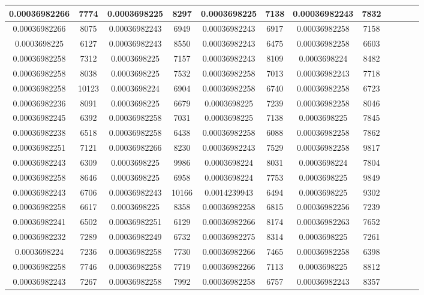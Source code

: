 \begin {table}[h]
\begin{tabular}{|c|c|c|c|c|c|c|c|c|c|c|c|}
\midrule
0.00036982266&7774&0.0003698225&8297&0.0003698225&7138&0.00036982243&7832\\
\midrule
0.00036982266&8075&0.00036982243&6949&0.00036982243&6917&0.00036982258&7158\\
\midrule
0.0003698225&6127&0.00036982243&8550&0.00036982243&6475&0.00036982258&6603\\
\midrule
0.00036982258&7312&0.0003698225&7157&0.00036982243&8109&0.0003698224&8482\\
\midrule
0.00036982258&8038&0.0003698225&7532&0.00036982258&7013&0.00036982243&7718\\
\midrule
0.00036982258&10123&0.0003698224&6904&0.00036982258&6740&0.00036982258&6723\\
\midrule
0.00036982236&8091&0.0003698225&6679&0.0003698225&7239&0.00036982258&8046\\
\midrule
0.00036982245&6392&0.00036982258&7031&0.0003698225&7138&0.0003698225&7845\\
\midrule
0.00036982238&6518&0.00036982258&6438&0.00036982258&6088&0.00036982258&7862\\
\midrule
0.00036982251&7121&0.00036982266&8230&0.00036982243&7529&0.00036982258&9817\\
\midrule
0.00036982243&6309&0.0003698225&9986&0.0003698224&8031&0.0003698224&7804\\
\midrule
0.00036982258&8646&0.0003698225&6958&0.0003698224&7753&0.0003698225&9849\\
\midrule
0.00036982243&6706&0.00036982243&10166&0.0014239943&6494&0.0003698225&9302\\
\midrule
0.00036982258&6617&0.0003698225&8358&0.00036982258&6815&0.00036982256&7239\\
\midrule
0.00036982241&6502&0.00036982251&6129&0.00036982266&8174&0.00036982263&7652\\
\midrule
0.00036982232&7289&0.00036982249&6732&0.00036982275&8314&0.0003698225&7261\\
\midrule
0.0003698224&7236&0.00036982258&7730&0.00036982266&7465&0.00036982258&6398\\
\midrule
0.00036982258&7746&0.00036982258&7719&0.00036982266&7113&0.0003698225&8812\\
\midrule
0.00036982243&7267&0.00036982258&7992&0.00036982258&6757&0.00036982243&8357\\
\midrule
\end{tabular}
    
\end{table}

